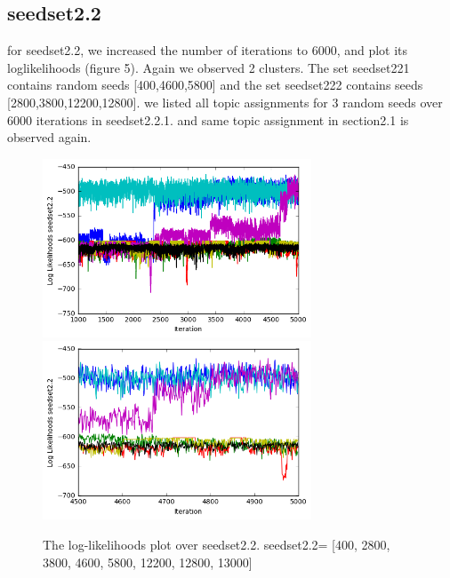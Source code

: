 \documentclass[11pt]{article}
\begin{document}
\begin{spacing}{1.6}
\subsection{seedset2.2}
\noindent for seedset2.2, we increased the number of iterations to 6000, and plot its loglikelihoods (figure 5). Again we observed 2 clusters. The set seedset221 contains random seeds [400,4600,5800] and the set seedset222 contains seeds [2800,3800,12200,12800]. we listed all topic assignments for 3 random seeds over 6000 iterations in seedset2.2.1. and same topic assignment in section2.1 is observed again.\\
\begin{minipage}{1.0\textwidth}
\begin{figure}[H]
\includegraphics[width = 80mm]{figure7.png}
\includegraphics[width = 80mm]{figure8.png}
\caption{The log-likelihoods plot over seedset2.2.  seedset2.2= [400, 2800, 3800, 4600, 5800, 12200, 12800, 13000]}\scriptsize
\end{figure}
\end{minipage}\\


\end{spacing}
\end{document}
